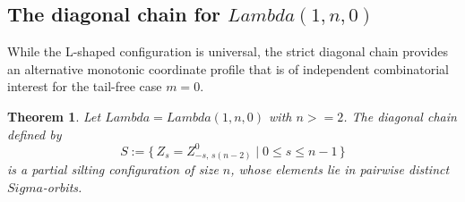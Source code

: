 \documentclass[11pt, a4paper]{article}
\newtheorem{theorem}{Theorem}[section]
\theoremstyle{definition}
\def\Lambda{Lambda}%
\def\Sigma{Sigma}%
\def\ge{>=}%
\begin{document}
\subsection{The diagonal chain for \texorpdfstring{$\Lambda(1,n,0)$}{Lambda(1,n,0)}}\label{sec:sharp-diag}

While the L-shaped configuration is universal, the strict diagonal chain provides an alternative monotonic coordinate profile that is of independent combinatorial interest for the tail-free case $m=0$.

\begin{theorem}\label{thm:diag}
Let $\Lambda = \Lambda(1,n,0)$ with $n \ge 2$. The diagonal chain defined by
\[
  S := \bigl\{\, Z_s = Z_{-s,\, s(n-2)}^0 \;\big|\; 0 \le s \le n-1 \,\bigr\}
\]
is a partial silting configuration of size $n$, whose elements lie in pairwise distinct $\Sigma$-orbits.
\end{theorem}
\end{document}
